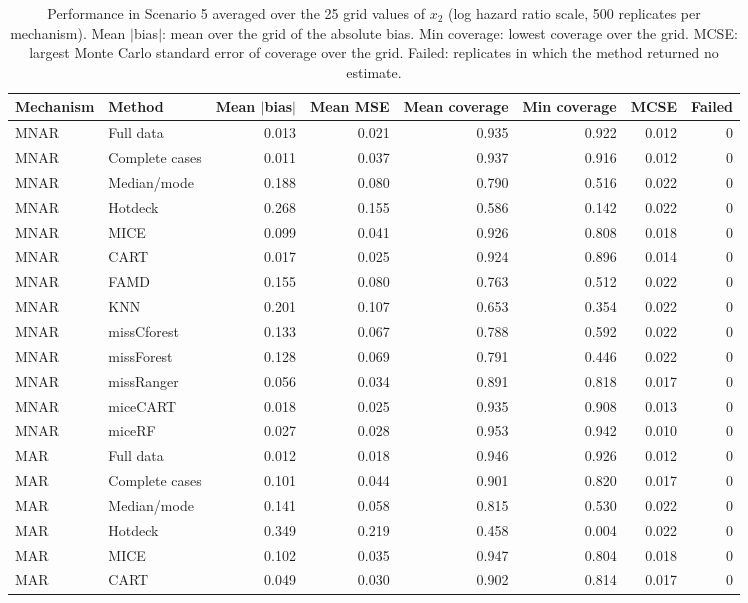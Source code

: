 \begin{table}[H]\centering\small
\caption{Performance in Scenario 5 averaged over the 25 grid values of $x_2$ (log hazard ratio scale, 500 replicates per mechanism). Mean $|$bias$|$: mean over the grid of the absolute bias. Min coverage: lowest coverage over the grid. MCSE: largest Monte Carlo standard error of coverage over the grid. Failed: replicates in which the method returned no estimate.}\label{tab:c1}
\begin{tabular}{llrrrrrr}
\toprule
Mechanism & Method & Mean $|$bias$|$ & Mean MSE & Mean coverage & Min coverage & MCSE & Failed \\
\midrule
MNAR & Full data & 0.013 & 0.021 & 0.935 & 0.922 & 0.012 & 0 \\
MNAR & Complete cases & 0.011 & 0.037 & 0.937 & 0.916 & 0.012 & 0 \\
MNAR & Median/mode & 0.188 & 0.080 & 0.790 & 0.516 & 0.022 & 0 \\
MNAR & Hotdeck & 0.268 & 0.155 & 0.586 & 0.142 & 0.022 & 0 \\
MNAR & MICE & 0.099 & 0.041 & 0.926 & 0.808 & 0.018 & 0 \\
MNAR & CART & 0.017 & 0.025 & 0.924 & 0.896 & 0.014 & 0 \\
MNAR & FAMD & 0.155 & 0.080 & 0.763 & 0.512 & 0.022 & 0 \\
MNAR & KNN & 0.201 & 0.107 & 0.653 & 0.354 & 0.022 & 0 \\
MNAR & missCforest & 0.133 & 0.067 & 0.788 & 0.592 & 0.022 & 0 \\
MNAR & missForest & 0.128 & 0.069 & 0.791 & 0.446 & 0.022 & 0 \\
MNAR & missRanger & 0.056 & 0.034 & 0.891 & 0.818 & 0.017 & 0 \\
MNAR & miceCART & 0.018 & 0.025 & 0.935 & 0.908 & 0.013 & 0 \\
MNAR & miceRF & 0.027 & 0.028 & 0.953 & 0.942 & 0.010 & 0 \\ \midrule
MAR & Full data & 0.012 & 0.018 & 0.946 & 0.926 & 0.012 & 0 \\
MAR & Complete cases & 0.101 & 0.044 & 0.901 & 0.820 & 0.017 & 0 \\
MAR & Median/mode & 0.141 & 0.058 & 0.815 & 0.530 & 0.022 & 0 \\
MAR & Hotdeck & 0.349 & 0.219 & 0.458 & 0.004 & 0.022 & 0 \\
MAR & MICE & 0.102 & 0.035 & 0.947 & 0.804 & 0.018 & 0 \\
MAR & CART & 0.049 & 0.030 & 0.902 & 0.814 & 0.017 & 0 \\

\end{tabular}
\end{table}
